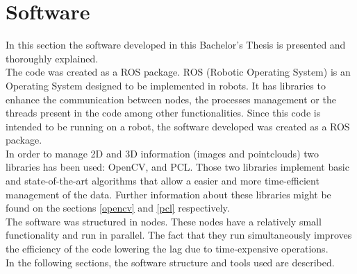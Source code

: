 \chapter{Software}

In this section the software developed in this Bachelor's Thesis is presented and thoroughly explained. 
\\

The code was created as a ROS package. ROS (Robotic Operating System) is an Operating System designed to be implemented in robots. It has libraries to enhance the communication between nodes, the processes management or the threads present in the code among other functionalities. 
Since this code is intended to be running on a robot, the software developed was created as a ROS package. 
\\

In order to manage 2D and 3D information (images and pointclouds) two libraries has been used: OpenCV, and PCL. Those two libraries implement basic and state-of-the-art algorithms that allow a easier and more time-efficient management of the data. Further information about these libraries might be found on the sections \ref{opencv} and \ref{pcl} respectively. 
\\

The software was structured in nodes. These nodes have a relatively small functionality and run in parallel. The fact that they run simultaneously improves the efficiency of the code lowering the lag due to time-expensive operations. 
\\

In the following sections, the software structure and tools used are described. 


\newpage



\newpage

 




